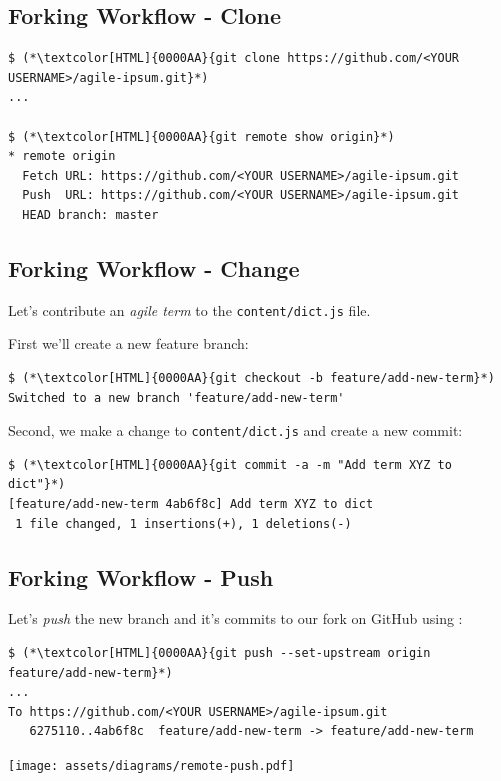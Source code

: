 \subsection{Forking Workflow - Clone}
\begin{frame}[fragile]
  \subslidetitle

  \begin{lstlisting}
$ (*\textcolor[HTML]{0000AA}{git clone https://github.com/<YOUR USERNAME>/agile-ipsum.git}*)
...

$ (*\textcolor[HTML]{0000AA}{git remote show origin}*)
* remote origin
  Fetch URL: https://github.com/<YOUR USERNAME>/agile-ipsum.git
  Push  URL: https://github.com/<YOUR USERNAME>/agile-ipsum.git
  HEAD branch: master
\end{lstlisting}

\end{frame}

\subsection{Forking Workflow - Change}
\begin{frame}[fragile]
  \subslidetitle

  Let's contribute an \textit{agile term} to the \lstinline{content/dict.js} file.
  \vspace{1em}

  First we'll create a new feature branch:

  \begin{lstlisting}
$ (*\textcolor[HTML]{0000AA}{git checkout -b feature/add-new-term}*)
Switched to a new branch 'feature/add-new-term'
\end{lstlisting}

  Second, we make a change to \lstinline{content/dict.js} and create a new commit:

  \begin{lstlisting}
$ (*\textcolor[HTML]{0000AA}{git commit -a -m "Add term XYZ to dict"}*)
[feature/add-new-term 4ab6f8c] Add term XYZ to dict
 1 file changed, 1 insertions(+), 1 deletions(-)
\end{lstlisting}

\end{frame}

\subsection{Forking Workflow - Push}
\begin{frame}[fragile]
  \subslidetitle

  Let's \textit{push} the new branch and it's commits to our fork on GitHub using :

  \begin{lstlisting}
$ (*\textcolor[HTML]{0000AA}{git push --set-upstream origin feature/add-new-term}*)
...
To https://github.com/<YOUR USERNAME>/agile-ipsum.git
   6275110..4ab6f8c  feature/add-new-term -> feature/add-new-term
\end{lstlisting}

  \centerline{\texttt{[image: assets/diagrams/remote-push.pdf]}}

\end{frame}

